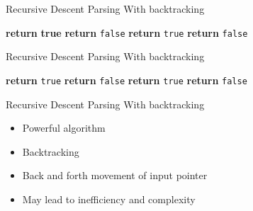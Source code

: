 \documentclass{beamer}
\begin{document}
\begin{frame}{Recursive Descent Parsing}
{With backtracking}
\begin{scriptsize}
\begin{algorithmic}[0]
        \State \textbf{return} \textbf{true}
      \Else
        \State \textbf{return} \texttt{false}
      \EndIf
        \State \textbf{return} \texttt{true}
      \EndIf
    \EndIf
  \Else
    \State \textbf{return} \texttt{false}
  \EndIf
\EndProcedure
\end{algorithmic}
\end{scriptsize}
\end{frame}

\begin{frame}{Recursive Descent Parsing}
{With backtracking}
\begin{scriptsize}
\begin{algorithmic}[0]
    \State \textbf{return} \texttt{true}
  \Else
    \State \textbf{return} \texttt{false}
  \EndIf
\EndProcedure
\Statex
{} 
    \State \textbf{return} \texttt{true}
  \Else
    \State \textbf{return} \texttt{false}
  \EndIf
\EndProcedure
\end{algorithmic}
\end{scriptsize}
\end{frame}

\begin{frame}{Recursive Descent Parsing}
{With backtracking}

\begin{itemize}
\item Powerful algorithm
\item Backtracking
\item Back and forth movement of input pointer
\item May lead to inefficiency and complexity
\end{itemize}
\end{frame}
\end{document}
